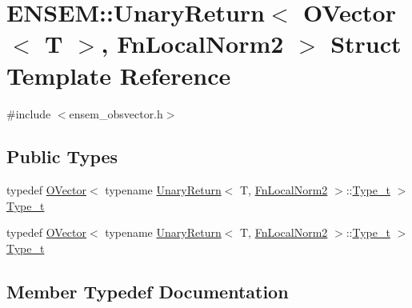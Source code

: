 \hypertarget{structENSEM_1_1UnaryReturn_3_01OVector_3_01T_01_4_00_01FnLocalNorm2_01_4}{}\section{E\+N\+S\+EM\+:\+:Unary\+Return$<$ O\+Vector$<$ T $>$, Fn\+Local\+Norm2 $>$ Struct Template Reference}
\label{structENSEM_1_1UnaryReturn_3_01OVector_3_01T_01_4_00_01FnLocalNorm2_01_4}


{\ttfamily \#include $<$ensem\+\_\+obsvector.\+h$>$}

\subsection*{Public Types}
\begin{DoxyCompactItemize}
\item 
typedef \mbox{\hyperlink{classENSEM_1_1OVector}{O\+Vector}}$<$ typename \mbox{\hyperlink{structENSEM_1_1UnaryReturn}{Unary\+Return}}$<$ T, \mbox{\hyperlink{structENSEM_1_1FnLocalNorm2}{Fn\+Local\+Norm2}} $>$\+::\mbox{\hyperlink{structENSEM_1_1UnaryReturn_3_01OVector_3_01T_01_4_00_01FnLocalNorm2_01_4_ae6ea88d668b9a06249f8681572c8a7d4}{Type\+\_\+t}} $>$ \mbox{\hyperlink{structENSEM_1_1UnaryReturn_3_01OVector_3_01T_01_4_00_01FnLocalNorm2_01_4_ae6ea88d668b9a06249f8681572c8a7d4}{Type\+\_\+t}}
\item 
typedef \mbox{\hyperlink{classENSEM_1_1OVector}{O\+Vector}}$<$ typename \mbox{\hyperlink{structENSEM_1_1UnaryReturn}{Unary\+Return}}$<$ T, \mbox{\hyperlink{structENSEM_1_1FnLocalNorm2}{Fn\+Local\+Norm2}} $>$\+::\mbox{\hyperlink{structENSEM_1_1UnaryReturn_3_01OVector_3_01T_01_4_00_01FnLocalNorm2_01_4_ae6ea88d668b9a06249f8681572c8a7d4}{Type\+\_\+t}} $>$ \mbox{\hyperlink{structENSEM_1_1UnaryReturn_3_01OVector_3_01T_01_4_00_01FnLocalNorm2_01_4_ae6ea88d668b9a06249f8681572c8a7d4}{Type\+\_\+t}}
\end{DoxyCompactItemize}


\subsection{Member Typedef Documentation}
\mbox{\label{structENSEM_1_1UnaryReturn_3_01OVector_3_01T_01_4_00_01FnLocalNorm2_01_4_ae6ea88d668b9a06249f8681572c8a7d4}} 
